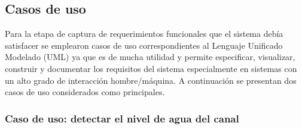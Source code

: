 \vspace{2cm}

\subsection{Casos de uso}
\label{subsec:Casos de uso}
Para la etapa de captura de requerimientos funcionales que el sistema debía satisfacer se emplearon casos de uso correspondientes al Lenguaje Unificado Modelado (UML) ya que es de mucha utilidad y permite especificar, visualizar, construir y documentar los requisitos del sistema especialmente en sistemas con un alto grado de interacción hombre/máquina. A continuación se presentan dos casos de uso considerados como principales.

\subsubsection{Caso de uso: detectar el nivel de agua del canal}
